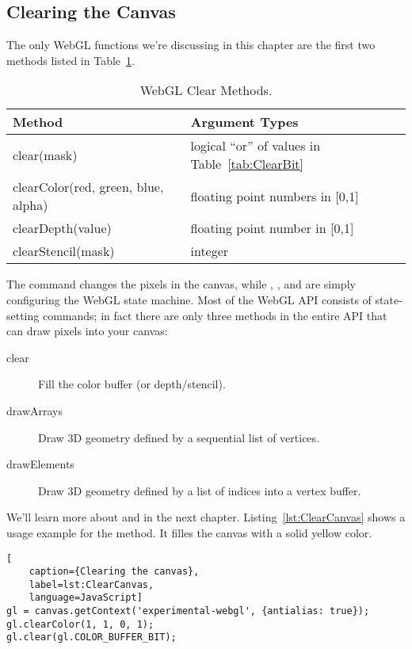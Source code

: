 
\subsection{Clearing the Canvas}

The only WebGL functions we're discussing in this chapter are the first two methods listed in Table~\ref{tab:Clearing}.

\begin{table}[htb]\centering
  \begin{tabular}{ll}
    \hline
    Method & Argument Types \\
    \hline
    clear(mask) & logical ``or'' of values in Table~\ref{tab:ClearBit} \\
    clearColor(red, green, blue, alpha)  & floating point numbers in [0,1] \\
    clearDepth(value) & floating point number in [0,1] \\
    clearStencil(mask) & integer \\
    \hline
  \end{tabular}
  \caption{WebGL Clear Methods.}
  \label{tab:Clearing}
\end{table}

The  command changes the pixels in the canvas, while , , and  are simply configuring the WebGL state machine.  Most of the WebGL API consists of state-setting commands; in fact there are only three methods in the entire API that can draw pixels into your canvas:

\begin{description}
\item[clear] Fill the color buffer (or depth/stencil).
\item[drawArrays] Draw 3D geometry defined by a sequential list of vertices.
\item[drawElements] Draw 3D geometry defined by a list of indices into a vertex buffer.
\end{description}

We'll learn more about  and  in the next chapter.  Listing~\ref{lst:ClearCanvas} shows a usage example for the  method.  It filles the canvas with a solid yellow color.

\begin{lstlisting}[
    caption={Clearing the canvas},
    label=lst:ClearCanvas,
    language=JavaScript]
gl = canvas.getContext('experimental-webgl', {antialias: true});
gl.clearColor(1, 1, 0, 1);
gl.clear(gl.COLOR_BUFFER_BIT);
\end{lstlisting}

